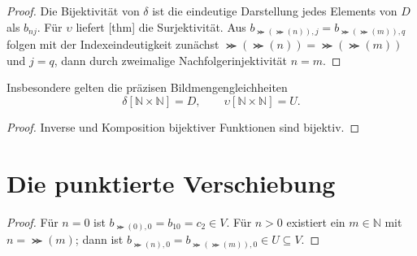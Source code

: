 \documentclass[main.tex]{subfiles}
\begin{document}
\begin{proof}
Die Bijektivität von \(\delta\) ist die eindeutige Darstellung jedes
Elements von \(D\) als \(b_{nj}\). Für \(\upsilon\) liefert
[thm] die Surjektivität.
Aus
\(b_{\Succ(\Succ(n)),j}=b_{\Succ(\Succ(m)),q}\) folgen mit der
Indexeindeutigkeit zunächst
\(\Succ(\Succ(n))=\Succ(\Succ(m))\) und \(j=q\), dann durch zweimalige
Nachfolgerinjektivität \(n=m\).
\end{proof}

Insbesondere gelten die präzisen Bildmengengleichheiten
\[
  \delta[\mathbb N\times\mathbb N]=D,
  \qquad
  \upsilon[\mathbb N\times\mathbb N]=U.
\]


\begin{proof}
Inverse und Komposition bijektiver Funktionen sind bijektiv.
\end{proof}

\section{Die punktierte Verschiebung}

\begin{proof}
Für \(n=0\) ist \(b_{\Succ(0),0}=b_{10}=c_2\in V\). Für \(n>0\)
existiert ein \(m\in\mathbb N\) mit \(n=\Succ(m)\); dann ist
\(b_{\Succ(n),0}=b_{\Succ(\Succ(m)),0}\in U\subseteq V\).
\end{proof}

\end{document}
